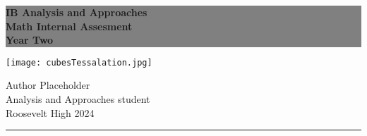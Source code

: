 \begin{titlepage} %
\colorbox{grey}{
	\parbox[t]{0.93\textwidth}{ %
		\parbox[t]{0.91\textwidth}{ %
			\raggedleft %
			\fontsize{20pt}{30pt}\selectfont %
			\vspace{0.7cm} %
			\color{color1}\sffamily\bfseries
			IB Analysis and Approaches\\
			Math Internal Assesment\\
			Year Two\\
			\vspace{0.7cm} %
		}
	}
}
	\vspace{-0.5\baselineskip} %
		\raggedleft %
		\texttt{[image: cubesTessalation.jpg]}
	\vfill %
	\parbox[t]{0.93\textwidth}{ %
		\raggedleft %
		\large %
		{\Large Author Placeholder}\\[4pt] %
		Analysis and Approaches student\\
		Roosevelt High 2024\\[4pt] %
		\hfill\rule{0.2\linewidth}{1pt}%
	}
\end{titlepage}

\maketitle %

